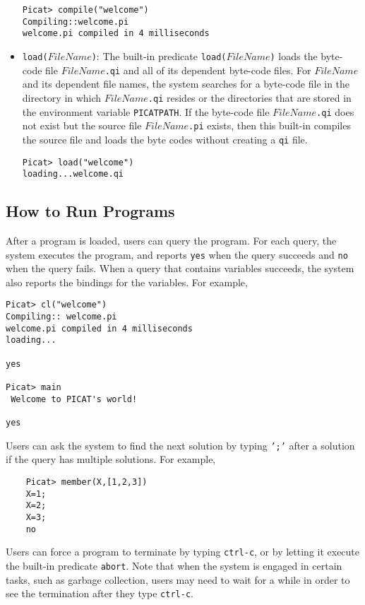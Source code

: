 \begin{itemize}
\begin{verbatim}
Picat> compile("welcome")
Compiling::welcome.pi
welcome.pi compiled in 4 milliseconds
\end{verbatim}

\item \texttt{load($FileName$)}: The built-in predicate \texttt{load($FileName$)} loads the byte-code file \texttt{$FileName$.qi} and all of its dependent byte-code files. For $FileName$ and its dependent file names,  the system searches for a byte-code file in the directory in which \texttt{$FileName$.qi} resides or the directories that are stored in the environment variable \texttt{PICATPATH}. If the byte-code file \texttt{$FileName$.qi} does not exist but the source file \texttt{$FileName$.pi} exists, then this built-in compiles the source file and loads the byte codes without creating a {\tt qi} file.

\begin{verbatim}
Picat> load("welcome")
loading...welcome.qi
\end{verbatim}
\end{itemize}

\subsection{How to Run Programs}
After a program is loaded, users can query the program. For each query, the system executes the program, and reports \texttt{yes} when the query succeeds and \texttt{no} when the query fails. When a query that contains variables succeeds, the system also reports the bindings for the variables. For example,

\begin{verbatim}
Picat> cl("welcome")
Compiling:: welcome.pi
welcome.pi compiled in 4 milliseconds
loading...

yes

Picat> main
 Welcome to PICAT's world! 
 
yes
\end{verbatim}

Users can ask the system to find the next solution by typing \texttt{';'} after a solution if the query has multiple solutions. For example,
\begin{verbatim}
    Picat> member(X,[1,2,3])
    X=1;
    X=2;
    X=3;
    no
\end{verbatim}
Users can force a program to terminate by typing \texttt{ctrl-c}, or by letting it execute the built-in predicate \texttt{abort}. Note that when the system is engaged in certain tasks, such as garbage collection, users may need to wait for a while in order to see the termination after they type \texttt{ctrl-c}.

